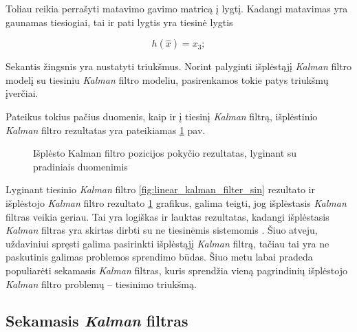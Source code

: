 Toliau reikia perrašyti matavimo gavimo matricą į lygtį.
Kadangi matavimas yra gaunamas tiesiogiai, tai ir pati lygtis yra tiesinė lygtis

\begin{equation}
    h(\hat{x}) = x_3;
\end{equation}

Sekantis žingsnis yra nustatyti triukšmus.
Norint palyginti išplėstąjį \textit{Kalman} filtro modelį su tiesiniu \textit{Kalman} filtro modeliu, pasirenkamos tokie patys triukšmų įverčiai.

Pateikus tokius pačius duomenis, kaip ir į tiesinį \textit{Kalman} filtrą, išplėstinio \textit{Kalman} filtro rezultatas yra pateikiamas \ref{fig:extended_kalman_filter_sin} pav.

\begin{figure}
    \centering
    \caption{Išplėsto Kalman filtro pozicijos pokyčio rezultatas, lyginant su pradiniais duomenimis}
    \label{fig:extended_kalman_filter_sin}
\end{figure}

Lyginant tiesinio \textit{Kalman} filtro \ref{fig:linear_kalman_filter_sin} rezultato ir išplėstojo \textit{Kalman} filtro rezultato \ref{fig:extended_kalman_filter_sin} grafikus, galima teigti, jog išplėstasis \textit{Kalman} filtras veikia geriau.
Tai yra logiškas ir lauktas rezultatas, kadangi išplėstasis \textit{Kalman} filtras yra skirtas dirbti su ne tiesinėmis sistemomis \cite{6851407}.
Šiuo atveju, uždaviniui spręsti galima pasirinkti išplėstąjį \textit{Kalman} filtrą, tačiau tai yra ne paskutinis galimas problemos sprendimo būdas.
Šiuo metu labai pradeda populiarėti sekamasis \textit{Kalman} filtras, kuris sprendžia vieną pagrindinių išplėstojo \textit{Kalman} filtro problemų -- tiesinimo triukšmą.

\subsection{Sekamasis \textit{Kalman} filtras}

